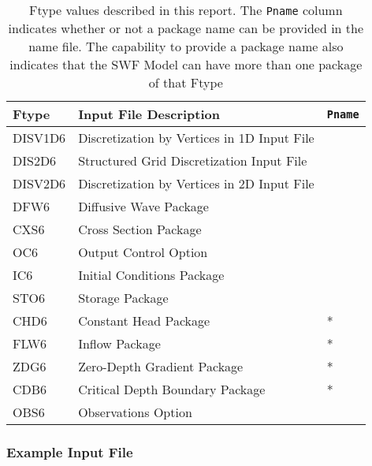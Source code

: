 \begin{table}[H]
\caption{Ftype values described in this report.  The \texttt{Pname} column indicates whether or not a package name can be provided in the name file.  The capability to provide a package name also indicates that the SWF Model can have more than one package of that Ftype}
\small
\begin{center}
\begin{tabular*}{\columnwidth}{l l l}
\hline
\hline
Ftype & Input File Description & \texttt{Pname}\\
\hline
DISV1D6 & Discretization by Vertices in 1D Input File \\
DIS2D6 & Structured Grid Discretization Input File \\
DISV2D6 & Discretization by Vertices in 2D Input File \\
DFW6 & Diffusive Wave Package \\ 
CXS6 & Cross Section Package \\ 
OC6 & Output Control Option \\
IC6 & Initial Conditions Package \\
STO6 & Storage Package \\
CHD6 & Constant Head Package & * \\ 
FLW6 & Inflow Package & * \\ 
ZDG6 & Zero-Depth Gradient Package & * \\ 
CDB6 & Critical Depth Boundary Package & * \\ 
OBS6 & Observations Option \\
\hline 
\end{tabular*}
\label{table:ftype}
\end{center}
\normalsize
\end{table}

\vspace{5mm}
\subsubsection{Example Input File}


